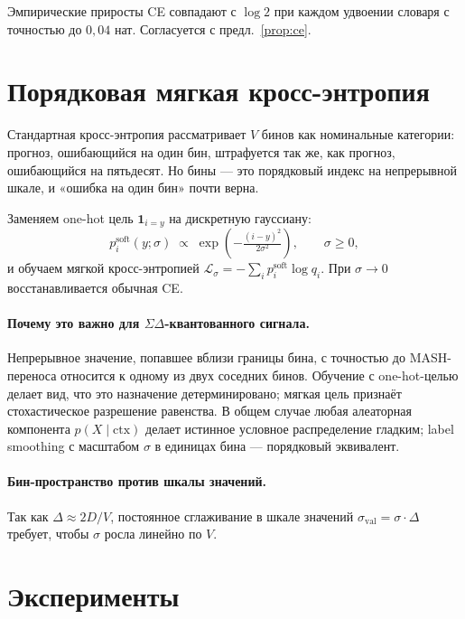 \documentclass[11pt]{article}
\theoremstyle{remark}
\begin{document}
Эмпирические приросты CE совпадают с $\log 2$ при каждом удвоении
словаря с точностью до $0{,}04$ нат. Согласуется с
предл.~\ref{prop:ce}.

\section{Порядковая мягкая кросс-энтропия}
\label{sec:loss}

Стандартная кросс-энтропия рассматривает $V$ бинов как номинальные
категории: прогноз, ошибающийся на один бин, штрафуется так же, как
прогноз, ошибающийся на пятьдесят. Но бины --- это порядковый индекс
на непрерывной шкале, и «ошибка на один бин» почти верна.

Заменяем one-hot цель $\mathbf 1_{i = y}$ на дискретную гауссиану:
\begin{equation}
p^{\text{soft}}_i(y; \sigma) \;\propto\; \exp\!\left(-\tfrac{(i - y)^2}{2\sigma^2}\right),
\qquad \sigma \ge 0,
\end{equation}
и обучаем мягкой кросс-энтропией $\mathcal L_\sigma = -\sum_i
p^{\text{soft}}_i \log q_i$. При $\sigma \to 0$ восстанавливается
обычная CE.

\paragraph{Почему это важно для $\Sigma\Delta$-квантованного сигнала.}
Непрерывное значение, попавшее вблизи границы бина, с точностью до
MASH-переноса относится к одному из двух соседних бинов. Обучение с
one-hot-целью делает вид, что это назначение детерминировано; мягкая
цель признаёт стохастическое разрешение равенства. В общем случае
любая алеаторная компонента $p(X \mid \mathrm{ctx})$ делает истинное
условное распределение гладким; label smoothing с масштабом $\sigma$
в единицах бина --- порядковый эквивалент.

\paragraph{Бин-пространство против шкалы значений.}
Так как $\Delta \approx 2D/V$, постоянное сглаживание в шкале значений
$\sigma_{\text{val}} = \sigma \cdot \Delta$ требует, чтобы $\sigma$
росла линейно по $V$.

\section{Эксперименты}
\label{sec:experiments}
\end{document}
